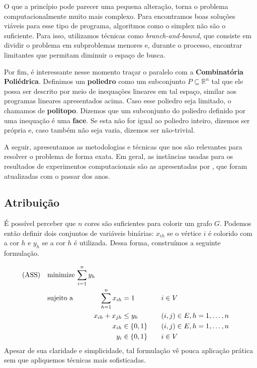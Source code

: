 \documentclass[11pt]{article}
\begin{document}
O que a princípio pode parecer uma pequena alteração, torna o problema computacionalmente muito mais complexo.
Para encontramos boas soluções viáveis para esse tipo de programa, algoritmos como o simplex não são o suficiente.
Para isso, utilizamos técnicas como \emph{branch-and-bound}, que consiste em dividir o problema em subproblemas menores e, durante o processo, encontrar limitantes que permitam diminuir o espaço de busca.

Por fim, é interessante nesse momento traçar o paralelo com a \textbf{Combinatória Poliédrica}.
Definimos um \textbf{poliedro} como um subconjunto \(P \subseteq \mathbb{R}^n\) tal que ele possa ser descrito por meio de inequações lineares em tal espaço, similar aos programas lineares apresentados acima.
Caso esse poliedro seja limitado, o chamamos de \textbf{politopo}.
Dizemos que um subconjunto do poliedro definido por uma inequação é uma \textbf{face}.
Se esta não for igual ao poliedro inteiro, dizemos ser própria e, caso também não seja vazia, dizemos ser não-trivial.

A seguir, apresentamos as metodologias e técnicas que nos são relevantes para resolver o problema de forma exata.
Em geral, as instâncias usadas para os resultados de experimentos computacionais são as apresentadas por \textcite{DIMACSGraphColoringInstances}, que foram atualizadas com o passar dos anos.

\subsection{Atribuição}
\label{sec:org43abafc}
É possível perceber que \(n\) cores são suficientes para colorir um grafo \(G\). Podemos então definir dois conjuntos de variáveis binárias: \(x_{ih}\) se o vértice \(i\) é colorido com a cor \(h\) e \(y_h\) se a cor \(h\) é utilizada. Dessa forma, construímos a seguinte formulação.

\begin{alignat*}{4}
\label{ass}
\mathrm{(ASS)} \quad & \omit\rlap{minimize  $\displaystyle \sum_{i=1}^n y_h$} \\
& \mbox{sujeito a}&& \quad & \sum_{h=1}^n x_{ih}&= 1        & \quad & i \in V \\
&                 &&   & x_{ih} + x_{jh}    & \leq y_h &   & (i,j) \in E, h=1,\dots,n \\
&                 &&   & x_{ih}    & \in \{0,1\} &   & (i,j) \in E, h=1,\dots,n\\
&                 &&   & y_i       & \in \{0,1\} &   & i \in V
\end{alignat*}
Apesar de sua claridade e simplicidade, tal formulação vê pouca aplicação prática sem que apliquemos técnicas mais sofisticadas.
\end{document}
